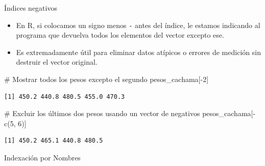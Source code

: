 \documentclass[
  ignorenonframetext,
  aspectratio=169,
  spanish,
]{beamer}
\newenvironment{Shaded}{\begin{snugshade}}{\end{snugshade}}
\newcommand{\CommentTok}[1]{\textcolor[rgb]{0.37,0.37,0.37}{#1}}
\newcommand{\DecValTok}[1]{\textcolor[rgb]{0.68,0.00,0.00}{#1}}
\newcommand{\FunctionTok}[1]{\textcolor[rgb]{0.28,0.35,0.67}{#1}}
\newcommand{\NormalTok}[1]{\textcolor[rgb]{0.00,0.23,0.31}{#1}}
\newcommand{\SpecialCharTok}[1]{\textcolor[rgb]{0.37,0.37,0.37}{#1}}
\begin{document}
\begin{frame}[fragile]{Índices negativos}
\label{uxedndices-negativos}
\begin{itemize}
\item
  En R, si colocamos un signo menos \texttt{-} antes del índice, le
  estamos indicando al programa que devuelva todos los elementos del
  vector excepto ese.
\item
  Es extremadamente útil para eliminar datos atípicos o errores de
  medición sin destruir el vector original.
\end{itemize}

\begin{Shaded}
\begin{Highlighting}[]
\CommentTok{\# Mostrar todos los pesos excepto el segundo}
\NormalTok{pesos\_cachama[}\SpecialCharTok{{-}}\DecValTok{2}\NormalTok{]}
\end{Highlighting}
\end{Shaded}

\begin{verbatim}
[1] 450.2 440.8 480.5 455.0 470.3
\end{verbatim}

\begin{Shaded}
\begin{Highlighting}[]
\CommentTok{\# Excluir los últimos dos pesos usando un vector de negativos}
\NormalTok{pesos\_cachama[}\SpecialCharTok{{-}}\FunctionTok{c}\NormalTok{(}\DecValTok{5}\NormalTok{, }\DecValTok{6}\NormalTok{)]}
\end{Highlighting}
\end{Shaded}

\begin{verbatim}
[1] 450.2 465.1 440.8 480.5
\end{verbatim}
\end{frame}

\begin{frame}{Indexación por Nombres}
\label{indexaciuxf3n-por-nombres}
\end{frame}
\end{document}
